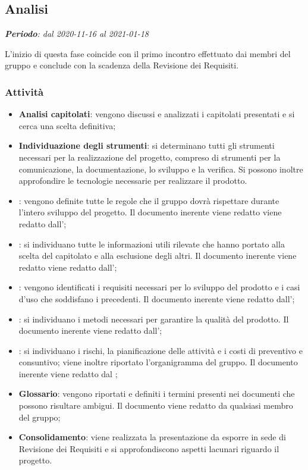 \subsection{Analisi}

\textit{\textbf{Periodo}: dal 2020-11-16 al 2021-01-18}

L'inizio di questa fase coincide con il primo incontro effettuato dai membri del gruppo e conclude con la scadenza della Revisione dei Requisiti.

\subsubsection{Attività}

\begin{itemize}
\item \textbf{Analisi capitolati}: vengono discussi e analizzati i capitolati presentati e si cerca una scelta definitiva;
\item \textbf{Individuazione degli strumenti}: si determinano tutti gli strumenti necessari per la realizzazione del progetto, compreso di strumenti per la comunicazione, la documentazione, lo sviluppo e la verifica. Si possono inoltre approfondire le tecnologie necessarie per realizzare il prodotto.
\item \textbf{\NdP{}}: vengono definite tutte le regole che il gruppo dovrà rispettare durante l'intero sviluppo del progetto. Il documento inerente viene redatto viene redatto dall'\ammProg{};
\item \textbf{\SdF{}}: si individuano tutte le informazioni utili rilevate che hanno portato alla scelta del capitolato e alla esclusione degli altri. Il documento inerente viene redatto viene redatto dall'\analProg{};
\item \textbf{\AdR{}}: vengono identificati i requisiti necessari per lo sviluppo del prodotto e i casi d'uso che soddisfano i precedenti. Il documento inerente viene redatto dall'\analProg{};
\item \textbf{\PdQ{}}: si individuano i metodi necessari per garantire la qualità del prodotto. Il documento inerente viene redatto dall'\ammProg{};
\item \textbf{\PdP{}}: si individuano i rischi, la pianificazione delle attività e i costi di preventivo e consuntivo; viene inoltre riportato l'organigramma del gruppo. Il documento inerente viene redatto dal \respProg{};
\item \textbf{Glossario}: vengono riportati e definiti i termini presenti nei documenti che possono risultare ambigui. Il documento viene redatto da qualsiasi membro del gruppo;
\item \textbf{Consolidamento}: viene realizzata la presentazione da esporre in sede di Revisione dei Requisiti e si approfondiscono aspetti lacunari riguardo il progetto.
\end{itemize}

